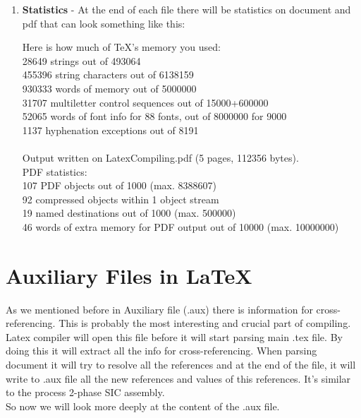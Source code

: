 \documentclass[a4paper,oneside,8pt]{extarticle}
\newcommand{\latex}{\LaTeX\xspace}
\begin{document}
\begin{enumerate}
    \item \textbf{Statistics} - At the end of each file there will be statistics on document and pdf that can look something like this:
        \begin{markdown-block}
            Here is how much of TeX's memory you used:\\
            28649 strings out of 493064\\
            455396 string characters out of 6138159\\
            930333 words of memory out of 5000000\\
            31707 multiletter control sequences out of 15000+600000\\
            52065 words of font info for 88 fonts, out of 8000000 for 9000\\
            1137 hyphenation exceptions out of 8191\\
            \\
            Output written on LatexCompiling.pdf (5 pages, 112356 bytes).\\
            PDF statistics:\\
            107 PDF objects out of 1000 (max. 8388607)\\
            92 compressed objects within 1 object stream\\
            19 named destinations out of 1000 (max. 500000)\\
            46 words of extra memory for PDF output out of 10000 (max. 10000000)\\
        \end{markdown-block}

\end{enumerate}


\section{Auxiliary Files in \latex}

As we mentioned before in Auxiliary file (.aux) there is information for cross-referencing. This is probably the most interesting and crucial part of compiling. Latex compiler will open this file before it will start parsing main .tex file. By doing this it will extract all the info for cross-referencing. When parsing document it will try to resolve all the references and at the end of the file, it will write to .aux file all the new references and values of this references. It's similar to the process 2-phase SIC assembly.\\
So now we will look more deeply at the content of the .aux file. 
\end{document}
